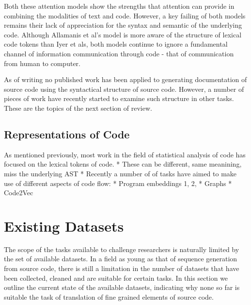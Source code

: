 Both these attention models show the strengths that attention can provide in combining the modalities of text and code. However, a key failing of both models remains their lack of appreciation for the syntax and semantic of the underlying code.
Although Allamanis et al's model is more aware of the structure of lexical code tokens than Iyer et als, both models continue to ignore a fundamental channel of information communication through code - that of communication from human to computer.


As of writing no published work has been applied to generating documentation of source code using the syntactical structure of source code.  However, a number of pieces of work have recently started to examine such structure in other tasks. These are the topics of the next section of review.

\subsection{Representations of Code}

As mentioned previously, most work in the field of statistical analysis of code has focused on the lexical tokens of code. 
* These can be different, same meanining, miss the underlying AST
* Recently a number of of tasks have aimed to make use of different aspects of code flow:
* Program embeddings 1, 2, 
* Graphs
* Code2Vec

\section{Existing Datasets}

The scope of the tasks available to challenge researchers is naturally limited by the set of available datasets.
In a field as young as that of sequence generation from source code, there is still a limitation in the number of datasets that have been collected, cleaned and are suitable for certain tasks.
In this section we outline the current state of the available datasets, indicating why none so far is suitable the task of translation of fine grained elements of source code.


